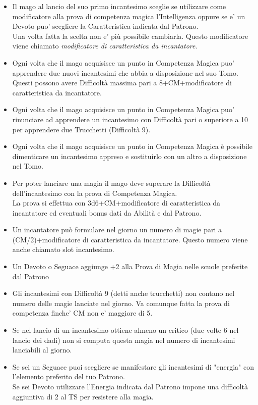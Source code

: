 \begin{multicols}{2}
\begin{itemize}

\item
Il mago al lancio del suo primo incantesimo sceglie se utilizzare come modificatore alla prova di competenza magica l'Intelligenza oppure se e' un Devoto puo' scegliere la Caratteristica indicata dal Patrono.\\
Una volta fatta la scelta non e' più possibile cambiarla. Questo modificatore viene chiamato \emph{modificatore di caratteristica da incantatore}.
\item 
Ogni volta che il mago acquisisce un punto in Competenza Magica puo' apprendere due nuovi incantesimi che abbia a disposizione nel suo Tomo. Questi possono avere Difficoltà massima pari a 8+CM+modificatore di caratteristica da incantatore.
\item
Ogni volta che il mago acquisisce un punto in Competenza Magica puo' rinunciare ad apprendere un incantesimo con Difficoltà pari o superiore a 10 per apprendere due Trucchetti (Difficoltà 9).
\item 
Ogni volta che il mago acquisisce un punto in Competenza Magica è possibile dimenticare un incantesimo appreso e sostituirlo con un altro a disposizione nel Tomo.
\item 
Per poter lanciare una magia il mago deve superare la Difficoltà dell'incantesimo con la prova di Competenza Magica.\\
La prova si effettua con 3d6+CM+modificatore di caratteristica da incantatore ed eventuali bonus dati da Abilità e dal Patrono.
\item 
Un incantatore può formulare nel giorno un numero di magie pari a (CM/2)+modificatore di caratteristica da incantatore. Questo numero viene anche chiamato slot incantesimo.
\item
Un Devoto o Seguace aggiunge +2 alla Prova di Magia nelle scuole preferite dal Patrono
\item
Gli incantesimi con Difficoltà 9 (detti anche trucchetti) non contano nel numero delle magie lanciate nel giorno. Va comunque fatta la prova di competenza finche' CM non e' maggiore di 5.
\item
Se nel lancio di un incantesimo ottiene almeno un critico (due volte 6 nel lancio dei dadi) non si computa questa magia nel numero di incantesimi lanciabili al giorno.
\item
Se sei un Seguace puoi scegliere se manifestare gli incantesimi di "energia" con l'elemento preferito del tuo Patrono.\\
Se sei Devoto utilizzare l'Energia indicata dal Patrono impone una difficoltà aggiuntiva di 2 al TS per resistere alla magia.
\end{itemize}


\end{multicols}
